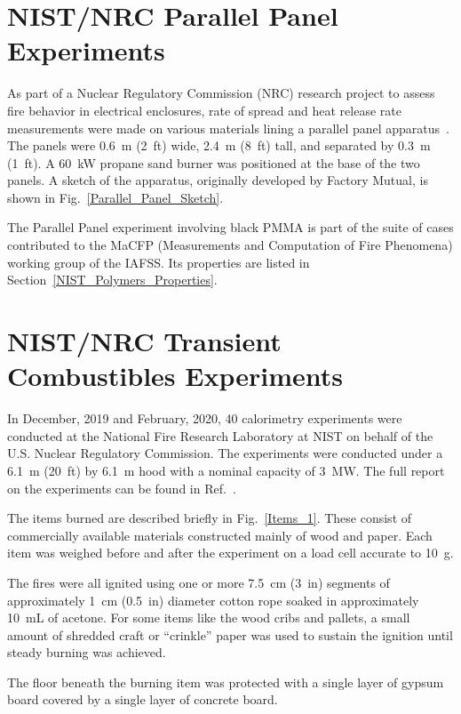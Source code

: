 \FloatBarrier

\section{NIST/NRC Parallel Panel Experiments}
\label{NIST_NRC_Parallel_Panels_Description}

As part of a Nuclear Regulatory Commission (NRC) research project to assess fire behavior in electrical enclosures, rate of spread and heat release rate measurements were made on various materials lining a parallel panel apparatus~\cite{Leventon:NIST_TN_2282}. The panels were 0.6~m (2~ft) wide, 2.4~m (8~ft) tall, and separated by 0.3~m (1~ft). A 60~kW propane sand burner was positioned at the base of the two panels. A sketch of the apparatus, originally developed by Factory Mutual, is shown in Fig.~\ref{Parallel_Panel_Sketch}.

The Parallel Panel experiment involving black PMMA is part of the suite of cases contributed to the MaCFP (Measurements and Computation of Fire Phenomena) working group of the IAFSS. Its properties are listed in Section~\ref{NIST_Polymers_Properties}.

\section{NIST/NRC Transient Combustibles Experiments}
\label{NIST_NRC_Transient_Combustibles_Description}

In December, 2019 and February, 2020, 40 calorimetry experiments were conducted at the National Fire Research Laboratory at NIST on behalf of the U.S. Nuclear Regulatory Commission. The experiments were conducted under a 6.1~m (20~ft) by 6.1~m hood with a nominal capacity of 3~MW. The full report on the experiments can be found in Ref.~\cite{McGrattan:Multiple_Transients_2020}.

The items burned are described briefly in Fig.~\ref{Items_1}. These consist of commercially available materials constructed mainly of wood and paper. Each item was weighed before and after the experiment on a load cell accurate to 10~g.

The fires were all ignited using one or more 7.5~cm (3~in) segments of approximately 1~cm (0.5~in) diameter cotton rope soaked in approximately 10~mL of acetone. For some items like the wood cribs and pallets, a small amount of shredded craft or ``crinkle'' paper was used to sustain the ignition until steady burning was achieved.

The floor beneath the burning item was protected with a single layer of gypsum board covered by a single layer of concrete board.


